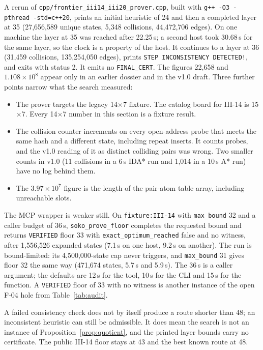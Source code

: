\documentclass[11pt,a4paper]{article}
\begin{document}
A rerun of \texttt{cpp/frontier\_iii14\_iii20\_prover.cpp}, built with \texttt{g++ -O3 -pthread -std=c++20}, prints an initial heuristic of 24 and then a completed layer at 35 (27,656,589 unique states, 5,348 collisions, 44,472,706 edges). On one machine the layer at 35 was reached after 22.25\,s; a second host took 30.68\,s for the same layer, so the clock is a property of the host. It continues to a layer at 36 (31,459 collisions, 135,254,050 edges), prints \texttt{STEP INCONSISTENCY DETECTED!}, and exits with status 2. It emits no \texttt{FINAL\_CERT}. The figures 22,658 and $1.108\times 10^{8}$ appear only in an earlier dossier and in the v1.0 draft. Three further points narrow what the search measured:
\begin{itemize}
  \item The prover targets the legacy 14$\times$7 fixture. The catalog board for III-14 is 15$\times$7. Every 14$\times$7 number in this section is a fixture result.
  \item The collision counter increments on every open-address probe that meets the same hash and a different state, including repeat inserts. It counts probes, and the v1.0 reading of it as distinct colliding pairs was wrong. Two smaller counts in v1.0 (11 collisions in a 6\,s IDA* run and 1,014 in a 10\,s A* run) have no log behind them.
  \item The $3.97\times 10^{7}$ figure is the length of the pair-atom table array, including unreachable slots.
\end{itemize}
The MCP wrapper is weaker still. On \texttt{fixture:III-14} with \texttt{max\_bound} 32 and a caller budget of 36\,s, \texttt{soko\_prove\_floor} completes the requested bound and returns \texttt{VERIFIED} floor 33 with \texttt{exact\_optimum\_reached} false and no witness, after 1,556,526 expanded states (7.1\,s on one host, 9.2\,s on another). The run is bound-limited: its 4,500,000-state cap never triggers, and \texttt{max\_bound} 31 gives floor 32 the same way (471,674 states, 5.7\,s and 5.9\,s). The 36\,s is a caller argument; the defaults are 12\,s for the tool, 10\,s for the CLI and 15\,s for the function. A \texttt{VERIFIED} floor of 33 with no witness is another instance of the open F-04 hole from Table~\ref{tab:audit}.

A failed consistency check does not by itself produce a route shorter than 48; an inconsistent heuristic can still be admissible. It does mean the search is not an instance of Proposition~\ref{prop:quotient}, and the printed layer bounds carry no certificate. The public III-14 floor stays at 43 and the best known route at 48.
\end{document}
